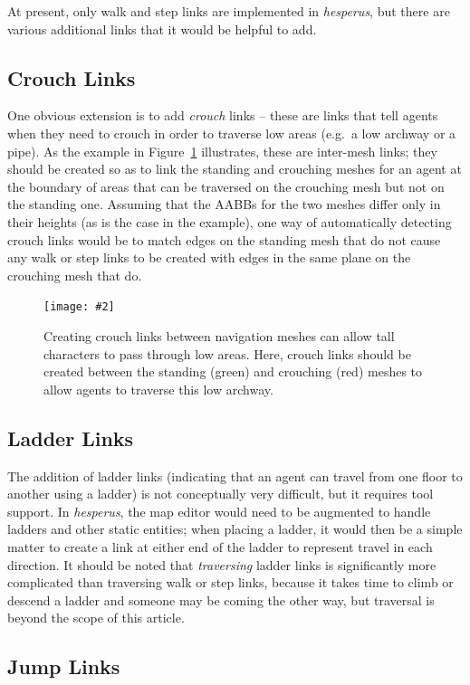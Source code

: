 \documentclass[10pt,twocolumn]{article}
\newcommand{\stufigex}[5]					%
{
	\begin{figure}[#5]
	\begin{center}
		\texttt{[image: \#2]}
		\caption{#3}
		\label{#4}
	\end{center}
	\end{figure}
}
\begin{document}
At present, only walk and step links are implemented in \emph{hesperus}, but there are various additional links that it would be helpful to add.

\subsection{Crouch Links}

One obvious extension is to add \emph{crouch} links -- these are links that tell agents when they need to crouch in order to traverse low areas (e.g.~a low archway or a pipe). As the example in Figure~\ref{fig:crouchlinks} illustrates, these are inter-mesh links; they should be created so as to link the standing and crouching meshes for an agent at the boundary of areas that can be traversed on the crouching mesh but not on the standing one. Assuming that the AABBs for the two meshes differ only in their heights (as is the case in the example), one way of automatically detecting crouch links would be to match edges on the standing mesh that do not cause any walk or step links to be created with edges in the same plane on the crouching mesh that do.

\stufigex{width=.9\linewidth}{crouchlinks.png}{Creating crouch links between navigation meshes can allow tall characters to pass through low areas. Here, crouch links should be created between the standing (green) and crouching (red) meshes to allow agents to traverse this low archway.}{fig:crouchlinks}{t}

\subsection{Ladder Links}

The addition of ladder links (indicating that an agent can travel from one floor to another using a ladder) is not conceptually very difficult, but it requires tool support. In \emph{hesperus}, the map editor would need to be augmented to handle ladders and other static entities; when placing a ladder, it would then be a simple matter to create a link at either end of the ladder to represent travel in each direction. It should be noted that \emph{traversing} ladder links is significantly more complicated than traversing walk or step links, because it takes time to climb or descend a ladder and someone may be coming the other way, but traversal is beyond the scope of this article.

\subsection{Jump Links}
\end{document}
